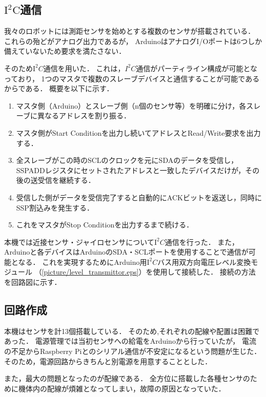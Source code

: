 \documentclass[11pt,a4]{jsarticle}
\begin{document}
  \subsection{$\mathrm{I^2C}$通信}
    我々のロボットには測距センサを始めとする複数のセンサが搭載されている．
    これらの殆どがアナログ出力であるが，
    ArduinoはアナログI/Oポートは6つしか備えていないため要求を満たさない．

    そのため$\mathrm{I^2}C$通信を用いた．
    これは，$I^2 C$通信がパーティライン構成が可能となっており，
    1つのマスタで複数のスレーブデバイスと通信することが可能であるからである．
    概要を以下に示す．
    \begin{enumerate}
      \item マスタ側（Arduino）とスレーブ側（n個のセンサ等）を明確に分け，各スレーブに異なるアドレスを割り振る．
      \item マスタ側がStart Conditionを出力し続いてアドレスとRead/Write要求を出力する．
      \item 全スレーブがこの時のSCLのクロックを元にSDAのデータを受信し，SSPADDレジスタにセットされたアドレスと一致したデバイスだけが，その後の送受信を継続する．
      \item 受信した側がデータを受信完了すると自動的にACKビットを返送し，同時にSSP割込みを発生する．
      \item これをマスタがStop Conditionを出力するまで続ける．
    \end{enumerate}

    本機では近接センサ・ジャイロセンサについて$\mathrm{I^2}C$通信を行った．
    また，Arduinoと各デバイスはArduinoのSDA・SCLポートを使用することで通信が可能となる．
    これを実現するためにArduino用$\mathrm{I^2}C$バス用双方向電圧レベル変換モジュール
    （\ref{picture/level_transmittor.eps}）を使用して接続した．
    接続の方法を回路図に示す．


  \subsection{回路作成}
    本機はセンサを計13個搭載している．
    そのため,それぞれの配線や配置は困難であった．
    電源管理では当初センサへの給電をArduinoから行っていたが，
    電流の不足からRaspberry Piとのシリアル通信が不安定になるという問題が生じた．
    そのため，電源回路からきちんと別電源を用意することとした．

    また，最大の問題となったのが配線である．
    全方位に搭載した各種センサのために機体内の配線が煩雑となってしまい，故障の原因となっていた．
\end{document}
